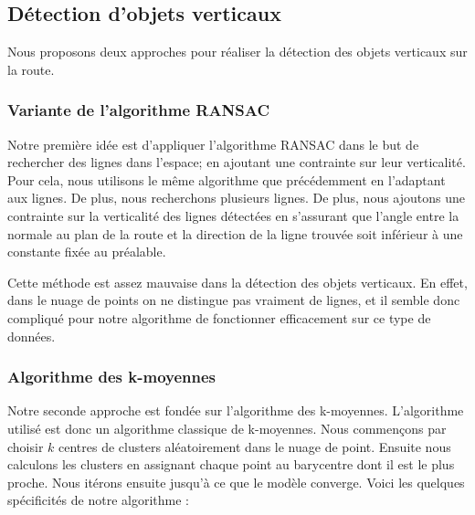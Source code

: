 \documentclass[titlepage,11pt,a4paper]{article}
\begin{document}
\subsection{Détection d'objets verticaux}
\par Nous proposons deux approches pour réaliser la détection des objets verticaux sur la route.

\subsubsection{Variante de l'algorithme RANSAC}
\par Notre première idée est d'appliquer l'algorithme RANSAC dans le but de rechercher des lignes dans l'espace; en ajoutant une contrainte sur leur verticalité. Pour cela, nous utilisons le même algorithme que précédemment en l'adaptant aux lignes. De plus, nous recherchons plusieurs lignes. De plus, nous ajoutons une contrainte sur la verticalité des lignes détectées en s'assurant que l'angle entre la normale au plan de la route et la direction de la ligne trouvée soit inférieur à une constante fixée au préalable.

\par Cette méthode est assez mauvaise dans la détection des objets verticaux. En effet, dans le nuage de points on ne distingue pas vraiment de lignes, et il semble donc compliqué pour notre algorithme de fonctionner efficacement sur ce type de données.

\subsubsection{Algorithme des k-moyennes}
\par Notre seconde approche est fondée sur l'algorithme des k-moyennes. L'algorithme utilisé est donc un algorithme classique de k-moyennes. Nous commençons par choisir $k$ centres de clusters aléatoirement dans le nuage de point. Ensuite nous calculons les clusters en assignant chaque point au barycentre dont il est le plus proche. Nous itérons ensuite jusqu'à ce que le modèle converge. Voici les quelques spécificités de notre algorithme :
\end{document}
